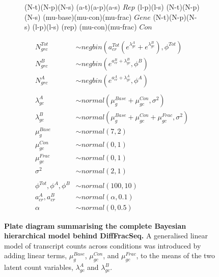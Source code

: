 \documentclass[../main.tex]{subfiles}
\begin{document}
\begin{figure}  [p]
\begin{subfigure}[b]{0.4\textwidth}
{        %
         {(N-t)(N-p)(N-s) %
                      (a-t)(a-p)(a-s)} {$Rep$}
         {(l-p)(l-s) %
                       (N-t)(N-p)(N-s) %
                       (mu-base)(mu-con)(mu-frac)} {$Gene$}
         {(N-t)(N-p)(N-s) %
                      (l-p)(l-s) %
                      (rep)%
                      (mu-con)(mu-frac)} {$Con$}
    }
    \end{subfigure}
     \hfill
     \begin{subfigure}[b]{0.5\textwidth}
     \centering
     \begin{align*}
        N^{Tot}_{grc} & \sim  negbin(a^{Tot}_{cr}(e^{\lambda^{A}_{gc}} + e^{\lambda^{B}_{gc}}), \phi^{Tot})\\
        N^{B}_{grc} & \sim  negbin(e^{a^{B}_{cr}+\lambda^{B}_{gc}}, \phi^{B})\\
        N^{A}_{grc} & \sim  negbin(e^{a^{A}_{cr}+\lambda^{A}_{gc}}, \phi^{A})\\
        \\
        \lambda^{A}_{gc} &\sim normal(\mu^{Base}_{g} + \mu^{Con}_{gc}, \sigma^2)\\
        \lambda^{B}_{gc} &\sim normal(\mu^{Base}_{g} + \mu^{Con}_{gc} + \mu^{Frac}_{gc}, \sigma^2)\\
        \mu^{Base}_{g} &\sim normal(7,2) \\
        \mu^{Con}_{gc} &\sim normal(0,1) \\
        \mu^{Frac}_{gc} &\sim normal(0,1) \\
        \sigma^2&\sim normal(2,1)\\
        \\
        \phi^{Tot}, \phi^{A}, \phi^{B}&\sim normal(100,10)\\
        a^{A}_{cr}, a^{B}_{cr}&\sim normal(\alpha, 0.1)\\
        \alpha&\sim normal(0, 0.5)
    \end{align*}
     \vspace{0.2cm}
     \end{subfigure}
     \caption[Graphical representation of the DiffFracSeq model with conditions.]{\textbf{Plate diagram summarising the complete Bayesian hierarchical model behind DiffFracSeq.} A generalised linear model of transcript counts across conditions was introduced by adding linear terms, $\mu^{Base}_{g}$, $\mu^{Con}_{gc}$, and $\mu^{Frac}_{gc}$, to the means of the two latent count variables, $\lambda^{A}_{gc}$ and $\lambda^{B}_{gc}$.}
     \label{fig:DiffFracQuant-con-plate-diagram}
\end{figure}
\end{document}
